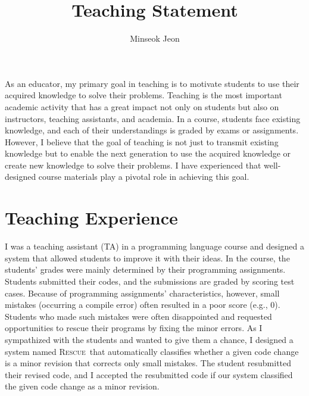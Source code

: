 \documentclass[11pt]{article}
\newcommand{\Rescue}{\textsc{Rescue}}
\begin{document}
\title{Teaching Statement}
\author{Minseok Jeon}
\date{}

\maketitle



As an educator, my primary goal in teaching is to motivate students to use their acquired knowledge to solve their problems. Teaching is the most important academic activity that has a great impact not only on students but also on instructors, teaching assistants, and academia. In a course, students face existing knowledge, and each of their understandings is graded by exams or assignments. However, I believe that the goal of teaching is not just to transmit existing knowledge but to enable the next generation to use the acquired knowledge or create new knowledge to solve their problems. I have experienced that well-designed course materials play a pivotal role in achieving this goal.








\section{Teaching Experience}
I was a teaching assistant (TA) in a programming language course and designed a system that allowed students to improve it with their ideas. In the course, the students' grades were mainly determined by their programming assignments.
Students submitted their codes, and the submissions are graded by scoring test cases.
Because of programming assignments' characteristics, however, small mistakes (occurring a compile error) often resulted in a poor score (e.g., 0). Students who made such mistakes were often disappointed and requested opportunities to rescue their programs by fixing the minor errors. As I sympathized with the students and wanted to give them a chance, I designed a system named \Rescue~that automatically classifies whether a given code change is a minor revision that corrects only small mistakes. The student resubmitted their revised code, and I accepted the resubmitted code if our system classified the given code change as a minor revision.
\end{document}
